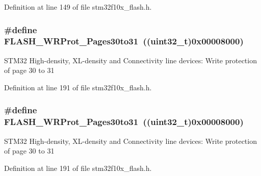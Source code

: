 Definition at line 149 of file stm32f10x\+\_\+flash.\+h.

\subsubsection[{\texorpdfstring{F\+L\+A\+S\+H\+\_\+\+W\+R\+Prot\+\_\+\+Pages30to31}{FLASH_WRProt_Pages30to31}}]{\setlength{\rightskip}{0pt plus 5cm}\#define F\+L\+A\+S\+H\+\_\+\+W\+R\+Prot\+\_\+\+Pages30to31~(({\bf uint32\+\_\+t})0x00008000)}\hypertarget{group___option___bytes___write___protection_gaabe41461f613c6eb37c782295ad9f90f}{}\label{group___option___bytes___write___protection_gaabe41461f613c6eb37c782295ad9f90f}
S\+T\+M32 High-\/density, X\+L-\/density and Connectivity line devices\+: Write protection of page 30 to 31 

Definition at line 191 of file stm32f10x\+\_\+flash.\+h.

\subsubsection[{\texorpdfstring{F\+L\+A\+S\+H\+\_\+\+W\+R\+Prot\+\_\+\+Pages30to31}{FLASH_WRProt_Pages30to31}}]{\setlength{\rightskip}{0pt plus 5cm}\#define F\+L\+A\+S\+H\+\_\+\+W\+R\+Prot\+\_\+\+Pages30to31~(({\bf uint32\+\_\+t})0x00008000)}\hypertarget{group___option___bytes___write___protection_gaabe41461f613c6eb37c782295ad9f90f}{}\label{group___option___bytes___write___protection_gaabe41461f613c6eb37c782295ad9f90f}
S\+T\+M32 High-\/density, X\+L-\/density and Connectivity line devices\+: Write protection of page 30 to 31 

Definition at line 191 of file stm32f10x\+\_\+flash.\+h.

